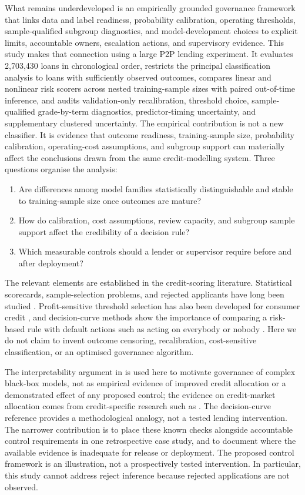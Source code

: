\documentclass[10pt]{article}
\begin{document}
What remains underdeveloped is an empirically grounded governance framework that links data and label readiness, probability calibration, operating thresholds, sample-qualified subgroup diagnostics, and model-development choices to explicit limits, accountable owners, escalation actions, and supervisory evidence. This study makes that connection using a large P2P lending experiment. It evaluates 2,703,430 loans in chronological order, restricts the principal classification analysis to loans with sufficiently observed outcomes, compares linear and nonlinear risk scorers across nested training-sample sizes with paired out-of-time inference, and audits validation-only recalibration, threshold choice, sample-qualified grade-by-term diagnostics, predictor-timing uncertainty, and supplementary clustered uncertainty. The empirical contribution is not a new classifier. It is evidence that outcome readiness, training-sample size, probability calibration, operating-cost assumptions, and subgroup support can materially affect the conclusions drawn from the same credit-modelling system. Three questions organise the analysis:

\begin{enumerate}
\item Are differences among model families statistically distinguishable and stable to training-sample size once outcomes are mature?
\item How do calibration, cost assumptions, review capacity, and subgroup sample support affect the credibility of a decision rule?
\item Which measurable controls should a lender or supervisor require before and after deployment?
\end{enumerate}

The relevant elements are established in the credit-scoring literature. Statistical scorecards, sample-selection problems, and rejected applicants have long been studied \cite{ref53,ref54,ref55,ref56}. Profit-sensitive threshold selection has also been developed for consumer credit \cite{ref57}, and decision-curve methods show the importance of comparing a risk-based rule with default actions such as acting on everybody or nobody \cite{ref58}. Here we do not claim to invent outcome censoring, recalibration, cost-sensitive classification, or an optimised governance algorithm.

The interpretability argument in \cite{ref7} is used here to motivate governance of complex black-box models, not as empirical evidence of improved credit allocation or a demonstrated effect of any proposed control; the evidence on credit-market allocation comes from credit-specific research such as \cite{ref2,ref17}. The decision-curve reference \cite{ref58} provides a methodological analogy, not a tested lending intervention.
 The narrower contribution is to place these known checks alongside accountable control requirements in one retrospective case study, and to document where the available evidence is inadequate for release or deployment. The proposed control framework is an illustration, not a prospectively tested intervention. In particular, this study cannot address reject inference because rejected applications are not observed.
\end{document}
